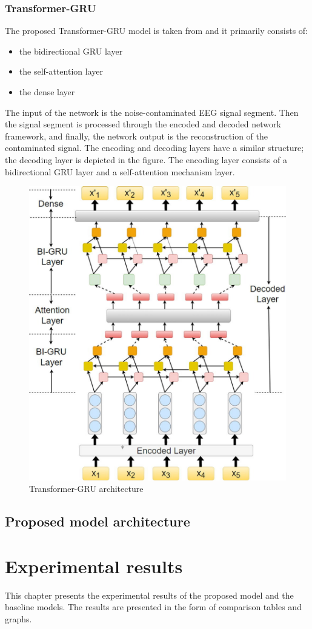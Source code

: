 \documentclass[a4paper]{sapthesis}
\begin{document}
\subsection{Transformer-GRU}\label{sec:model_transformer_gru}
The proposed Transformer-GRU model is taken from\cite{transformer GRU} and it 
primarily consists of:
\begin{itemize}
  \item the bidirectional GRU layer
  \item the self-attention layer
  \item the dense layer
\end{itemize}
The input of the network is the noise-contaminated EEG signal segment. 
Then the signal segment is processed through the encoded and decoded 
network framework, and finally, the network output is the reconstruction 
of the contaminated signal. The encoding and decoding layers have a 
similar structure; the decoding layer is depicted in the figure. 
The encoding layer consists of a bidirectional GRU layer and a 
self-attention mechanism layer.
\begin{figure}[h!]
\centering
\includegraphics[width=0.6\linewidth]{images/model_architecture_transformer_gru.PNG}
\caption{Transformer-GRU architecture}
\end{figure}
\section{Proposed model architecture}\label{sec:model_proposed}
\chapter{Experimental results}
This chapter presents the experimental results of the proposed model and
the baseline models. The results are presented in the form of comparison tables
and graphs. 
\end{document}
